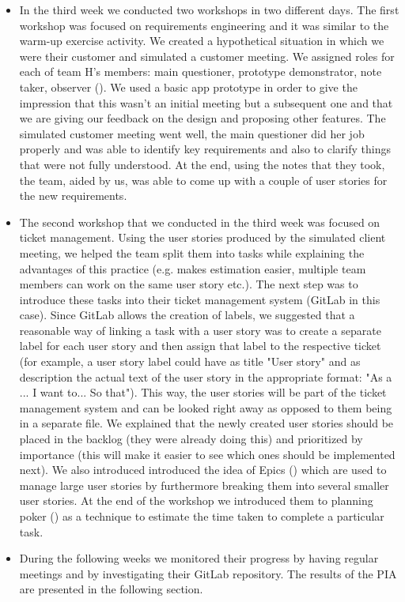 \documentclass[11pt]{article}
\begin{document}
\begin{itemize}
\item In the third week we conducted two workshops in two different days. The first workshop was focused on requirements engineering and it was similar to the warm-up exercise activity. We created a hypothetical situation in which we were their customer and simulated a customer meeting. We assigned roles for each of team H's members: main questioner, prototype demonstrator, note taker, observer (\citet[Chapter~4]{softengbook}). We used a basic app prototype in order to give the impression that this wasn't an initial meeting but a subsequent one and that we are giving our feedback on the design and proposing other features. The simulated customer meeting went well, the main questioner did her job properly and was able to identify key requirements and also to clarify things that were not fully understood. At the end, using the notes that they took, the team, aided by us, was able to come up with a couple of user stories for the new requirements.
\item The second workshop that we conducted in the third week was focused on ticket management. Using the user stories produced by the simulated client meeting, we helped the team split them into tasks while explaining the advantages of this practice (e.g. makes estimation easier, multiple team members can work on the same user story etc.).  The next step was to introduce these tasks into their ticket management system (GitLab in this case). Since GitLab allows the creation of labels, we suggested that a reasonable way of linking a task with a user story was to create a separate label for each user story and then assign that label to the respective ticket (for example, a user story label could have as title "User story" and as description the actual text of the user story in the appropriate format: "As a ... I want to... So that"). This way, the user stories will be part of the ticket management system and can be looked right away as opposed to them being in a separate file. We explained that the newly created user stories should be placed in the backlog (they were already doing this) and prioritized by importance (this will make it easier to see which ones should be implemented next). We also introduced introduced the idea of Epics (\citet{epics}) which are used to manage large user stories by furthermore breaking them into several smaller user stories. At the end of the workshop we introduced them to planning poker (\citet{agile-estimating}) as a technique to estimate the time taken to complete a particular task.

\item During the following weeks we monitored their progress by having regular meetings and by investigating their GitLab repository. The results of the PIA are presented in the following section. 
\end{itemize}
\end{document}
